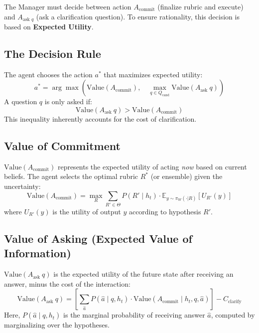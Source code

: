 \documentclass[letterpaper]{article}
\newcommand{\ThetaSet}{\Theta}
\newcommand{\Rubric}{R}
\newcommand{\Question}{q}
\newcommand{\AnswerSim}{\hat{a}}
\newcommand{\History}{h}
\newcommand{\Utility}{U}
\newcommand{\CostClarify}{C_{\text{clarify}}}
\begin{document}
The Manager must decide between action $A_{\text{commit}}$ (finalize rubric and execute) and $A_{\text{ask } \Question}$ (ask a clarification question). To ensure rationality, this decision is based on \textbf{Expected Utility}.

\subsection{The Decision Rule}
The agent chooses the action $a^*$ that maximizes expected utility:
\begin{equation}
    a^* = \arg\max \left( \text{Value}(A_{\text{commit}}), \quad \max_{\Question \in Q_{\text{cand}}} \text{Value}(A_{\text{ask }} \Question) \right)
\end{equation}
A question $\Question$ is only asked if:
\begin{equation}
    \text{Value}(A_{\text{ask }} \Question) > \text{Value}(A_{\text{commit}})
\end{equation}
This inequality inherently accounts for the cost of clarification.

\subsection{Value of Commitment}
$\text{Value}(A_{\text{commit}})$ represents the expected utility of acting \textit{now} based on current beliefs. The agent selects the optimal rubric $\Rubric^*$ (or ensemble) given the uncertainty:
\begin{equation}
    \text{Value}(A_{\text{commit}}) = \max_{\Rubric} \sum_{\Rubric' \in \ThetaSet} P(\Rubric' \mid \History_t) \cdot \mathbb{E}_{y \sim \pi_W(\cdot|\Rubric)}[\Utility_{\Rubric'}(y)]
\end{equation}
where $\Utility_{\Rubric'}(y)$ is the utility of output $y$ according to hypothesis $\Rubric'$.

\subsection{Value of Asking (Expected Value of Information)}
$\text{Value}(A_{\text{ask }} \Question)$ is the expected utility of the future state after receiving an answer, minus the cost of the interaction:
\begin{equation}
    \text{Value}(A_{\text{ask }} \Question) = \left[ \sum_{\AnswerSim} P(\AnswerSim \mid \Question, \History_t) \cdot \text{Value}(A_{\text{commit}} \mid \History_t, \Question, \AnswerSim) \right] - \CostClarify
\end{equation}
Here, $P(\AnswerSim \mid \Question, \History_t)$ is the marginal probability of receiving answer $\AnswerSim$, computed by marginalizing over the hypotheses.
\end{document}
